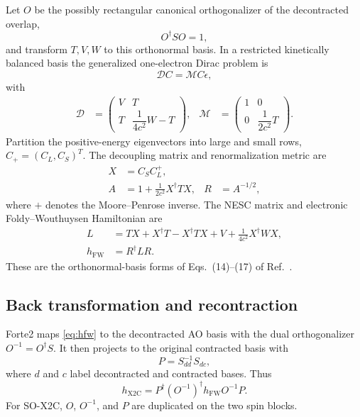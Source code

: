 \documentclass[aip,jcp,preprint]{revtex4-1}
\begin{document}
Let $O$ be the possibly rectangular canonical orthogonalizer of the
decontracted overlap,
\begin{equation}
 O^\dagger S O=1,
\end{equation}
and transform $T,V,W$ to this orthonormal basis.  In a restricted kinetically
balanced basis the generalized one-electron Dirac problem is
\begin{equation}
 \mathcal D C=\mathcal M C\epsilon,
 \label{eq:dirac_problem}
\end{equation}
with
\begin{align}
 \mathcal D&=
 \begin{pmatrix}
 V&T\\T&\dfrac{1}{4c^2}W-T
 \end{pmatrix}, &
 \mathcal M&=
 \begin{pmatrix}
 1&0\\0&\dfrac{1}{2c^2}T
 \end{pmatrix}.
 \label{eq:dirac_matrices}
\end{align}
Partition the positive-energy eigenvectors into large and small rows,
$C_+=(C_L,C_S)^T$.  The decoupling matrix and renormalization metric are
\begin{align}
 X&=C_SC_L^+,\\
 A&=1+\frac{1}{2c^2}X^\dagger T X,
 &R&=A^{-1/2},
 \label{eq:x_and_r}
\end{align}
where $+$ denotes the Moore--Penrose inverse.  The NESC matrix and electronic
Foldy--Wouthuysen Hamiltonian are
\begin{align}
 L&=TX+X^\dagger T-X^\dagger TX+V
   +\frac{1}{4c^2}X^\dagger W X,
 \label{eq:nesc}\\
 h_\mathrm{FW}&=R^\dagger L R.
 \label{eq:hfw}
\end{align}
These are the orthonormal-basis forms of Eqs.~(14)--(17) of
Ref.~.

\subsection{Back transformation and recontraction}

Forte2 maps \cref{eq:hfw} to the decontracted AO basis with the dual
orthogonalizer $O^{-1}=O^\dagger S$.  It then projects to the original
contracted basis with
\begin{equation}
 P=S_{dd}^{-1}S_{dc},
 \label{eq:projection}
\end{equation}
where $d$ and $c$ label decontracted and contracted bases.  Thus
\begin{equation}
 h_\mathrm{X2C}=P^\dagger (O^{-1})^\dagger
 h_\mathrm{FW}O^{-1}P.
 \label{eq:contracted_hx2c}
\end{equation}
For SO-X2C, $O$, $O^{-1}$, and $P$ are duplicated on the two spin blocks.
\end{document}
